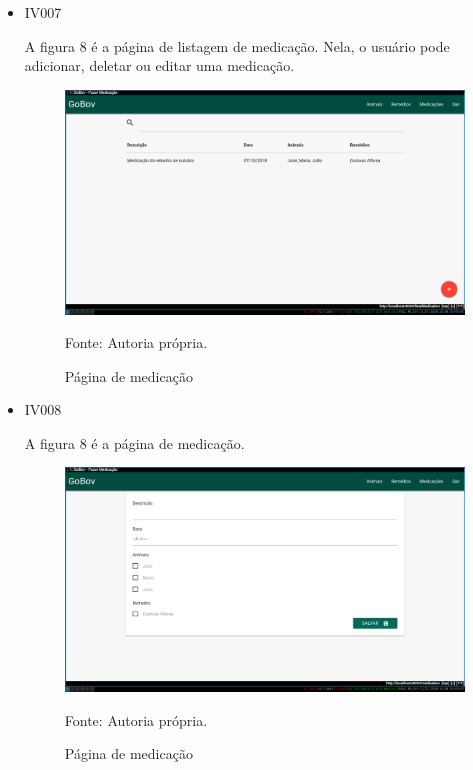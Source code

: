 \begin{itemize}
\newpage
\item IV007

A figura 8 é a página de listagem de medicação. Nela, o usuário pode adicionar, deletar ou editar uma medicação.
\begin{figure}[H]
	\begin{center}
		\caption{Página de medicação}
		\includegraphics[width=13cm]{../img/prototipos/listaMedicacao.png}

		Fonte: Autoria própria.
	\end{center}
\end{figure}

\item IV008

A figura 8 é a página de medicação.
\begin{figure}[H]
	\begin{center}
		\caption{Página de medicação}
		\includegraphics[width=13cm]{../img/prototipos/addMedicacao.png}

		Fonte: Autoria própria.
	\end{center}
\end{figure}


\end{itemize}
